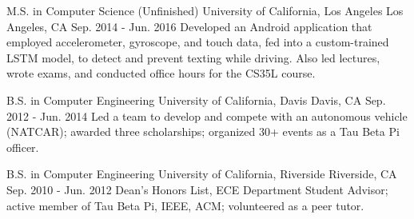 

\begin{cventries}

  \cventry
    {M.S. in Computer Science \fontsize{7}{12}\selectfont (Unfinished) \fontsize{7}{12}\selectfont} %
    {University of California, Los Angeles} %
    {Los Angeles, CA} %
    {Sep. 2014 - Jun. 2016} %
    {Developed an Android application that employed accelerometer, gyroscope, and touch data, fed into a custom-trained LSTM model, to detect and prevent texting while driving. Also led lectures, wrote exams, and conducted office hours for the CS35L course.} %
    {}

  \cventry
    {B.S. in Computer Engineering} %
    {University of California, Davis} %
    {Davis, CA} %
    {Sep. 2012 - Jun. 2014} %
    {Led a team to develop and compete with an autonomous vehicle (NATCAR); awarded three scholarships; organized 30+ events as a Tau Beta Pi officer.} %
    {}

  \cventry
    {B.S. in Computer Engineering} %
    {University of California, Riverside} %
    {Riverside, CA} %
    {Sep. 2010 - Jun. 2012} %
    {Dean's Honors List, ECE Department Student Advisor; active member of Tau Beta Pi, IEEE, ACM; volunteered as a peer tutor.} %
    {}

\end{cventries}
